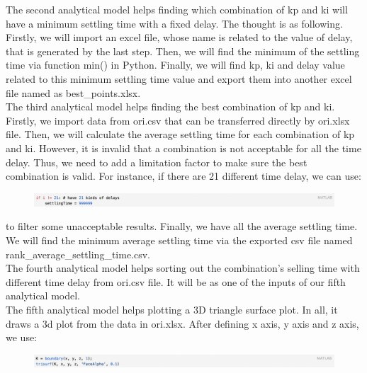 \documentclass{report}
\begin{document}
The second analytical model helps finding which combination of kp and ki will have a minimum settling time with a fixed delay. The thought is as following. Firstly, we will import an excel file, whose name is related to the value of delay,  that is generated by the last step. Then, we will find the minimum of the settling time via function min() in Python. Finally, we will find kp, ki and delay value related to this minimum settling time value and export them into another excel file named as best\_points.xlsx.\\

The third analytical model helps finding the best combination of kp and ki. Firstly, we import data from ori.csv that can be transferred directly by ori.xlsx file. Then, we will calculate the average settling time for each combination of kp and ki. However, it is invalid that a combination is not acceptable for all the time delay. Thus, we need to add a limitation factor to make sure the best combination is valid. For instance, if there are 21 different time delay, we can use:\\

\begin{figure}[htbp]
\centering
\includegraphics[width = .999\textwidth]{figure/3_4_2_code6.png}
\label{3_4_2_code6}
\end{figure}

to filter some unacceptable results. Finally, we have all the average settling time. We will find the minimum average settling time via the exported csv file named rank\_average\_settling\_time.csv.\\

The fourth analytical model helps sorting out the combination’s selling time with different time delay from ori.csv file. It will be as one of the inputs of our fifth analytical model.\\

The fifth analytical model helps plotting a 3D triangle surface plot. In all, it draws a 3d plot from the data in ori.xlsx. After defining x axis, y axis and z axis, we use:\\

\begin{figure}[htbp]
\centering
\includegraphics[width = .999\textwidth]{figure/3_4_2_code7.png}
\label{3_4_2_code7}
\end{figure}
\end{document}
